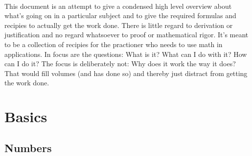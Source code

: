 \documentclass[12pt]{article}
\begin{document}
\paragraph{}
This document is an attempt to give a condensed high level overview about what's going on in a particular subject and to give the required formulas and recipies to actually get the work done. There is little regard to derivation or justification and no regard whatsoever to proof or mathematical rigor. It's meant to be a collection of recipies for the practioner who needs to use math in applications. In focus are the questions: What is it? What can I do with it? How can I do it? The focus is deliberately not: Why does it work the way it does? That would fill volumes (and has done so) and thereby just distract from getting the work done.

\section{Basics}
\subsection{Numbers} 
 
\end{document}
